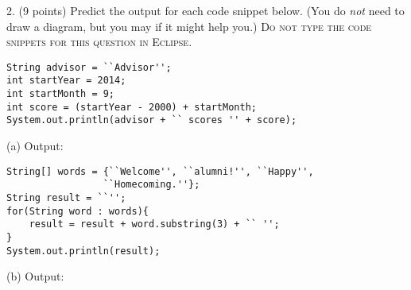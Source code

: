 \documentclass[12pt,twoside]{article}
\newcommand{\fillInBlank}[1][0.5in]{\underline{\hspace{#1}}}
\begin{document}
\clearpage

2. (9 points) Predict the output for each code snippet below. (You do \emph{not} need to draw a diagram, but you may if it might help you.) \textsc{Do not type the code snippets for this question in Eclipse}.
\vspace{0.25in}

\hfill
\begin{minipage}{0.60\linewidth}
\begin{lstlisting}
String advisor = ``Advisor'';
int startYear = 2014;
int startMonth = 9;
int score = (startYear - 2000) + startMonth;
System.out.println(advisor + `` scores '' + score);
\end{lstlisting}
\end{minipage}
\hspace{0.25in}
(a) Output: \fillInBlank[1in]

\vfill
\hfill
\begin{minipage}{0.60\linewidth}
\begin{lstlisting}
String[] words = {``Welcome'', ``alumni!'', ``Happy'', 
                 ``Homecoming.''};
String result = ``'';
for(String word : words){
	result = result + word.substring(3) + `` '';
}
System.out.println(result);
\end{lstlisting}
\end{minipage}
\hspace{0.25in}
(b) Output: \fillInBlank[1in]

\vfill
\hfill
\end{document}
